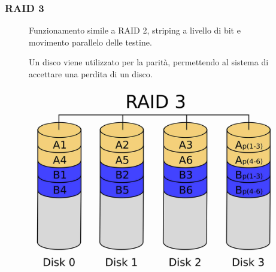 \subsubsection*{RAID 3}
\begin{figure}[H]
    \centering
    \begin{minipage}{0.65\textwidth}
        Funzionamento simile a RAID 2, striping a livello di bit e movimento parallelo delle testine.

        Un disco viene utilizzato per la parità, permettendo al sistema di accettare una perdita di un disco.
    \end{minipage}
    \hfill
    \begin{minipage}{0.3\textwidth}
        \centering
        \includegraphics[width=1\linewidth]{assets/RAID_3.jpeg}
    \end{minipage}
\end{figure}

